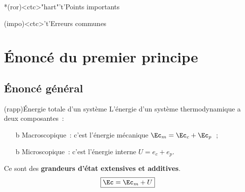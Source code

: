 \documentclass[../../main/main.tex]{subfiles}
\begin{document}
\begin{tcn}[sidebyside, fontupper=\small, fontlower=\small]
	\begin{tcn}*(ror)<ctc>"hart"'t'{Points importants}
	\end{tcn}
	\begin{tcn}(impo)<ctc>'t'{Erreurs communes}
	\end{tcn}
\end{tcn}

\vspace*{\fill}
\newpage

\section{Énoncé du premier principe}
\subsection{Énoncé général}
\begin{tcb}[sidebyside, righthand ratio=.2](rapp){Énergie totale d'un système}
	L'énergie d'un système thermodynamique a deux composantes~:
	\begin{itemize}
		\item[b]{Macroscopique}~: c'est l'énergie mécanique $\Ec_m = \Ec_c + \Ec_p$~;
		\item[b]{Microscopique}~: c'est l'énergie interne $U = e_c + e_p$.
	\end{itemize}
	Ce sont des \textbf{grandeurs d'état extensives et additives}.
	\tcblower
	\[
		\boxed{\Ec = \Ec_m + U}
	\]
\end{tcb}
\end{document}
